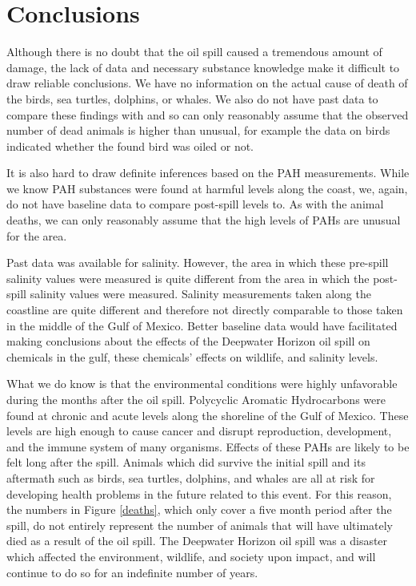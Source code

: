 \documentclass[authoryear,12pt]{elsarticle}
\begin{document}
\section{Conclusions}

Although there is no doubt that the oil spill caused a tremendous amount of damage, the lack of data  {and necessary substance knowledge} make it difficult to draw  {reliable} conclusions. We have no information on the actual cause of death of the birds, sea turtles, dolphins,  {or} whales.  We also do not have past data to compare these findings with and so can only reasonably assume that th{e observed} number of dead animals is  {higher than} unusual, {for example the data on birds indicated whether the found bird was oiled or not.} %

It is also hard to  {draw} definite inferences based on the PAH measurements.  While we know PAH substances were found at harmful levels along the coast, we{, again,} do not have baseline data to compare post-spill levels to. As with the animal deaths, we can only reasonably assume that the high levels of PAHs are unusual for the area. 

Past data was available for salinity. However, the area in which these pre-spill salinity values were measured is quite different from the area in which the post-spill salinity values were measured.  Salinity measurements taken along the coastline  {are} quite different and therefore not directly comparable to those taken in the middle of the Gulf of Mexico. Better baseline data would have facilitated making conclusions about the effects of the Deepwater Horizon oil spill on chemicals in the gulf, these chemicals' effects on wildlife, and salinity levels.

What we do know is that the environmental conditions were highly unfavorable during the months after the oil spill. Polycyclic Aromatic Hydrocarbons were found at chronic and acute levels along the shoreline of the Gulf of Mexico. These levels are high enough to cause cancer and disrupt reproduction, development, and the immune system of  {many} organisms. Effects of these PAHs are likely to be felt long after the spill. Animals which did survive the initial spill and its aftermath such as birds, sea turtles, dolphins, and whales are all at risk  {for developing} health problems in the future  {related to this event.} For this reason, the numbers in Figure \ref{deaths}, which only cover a five month period after the spill, do not entirely represent the number of animals that will have ultimately died as a result of the oil spill. The Deepwater Horizon oil spill was a disaster which affected the environment, wildlife, and society upon impact, and will continue to do so for an indefinite number of years.
\end{document}
